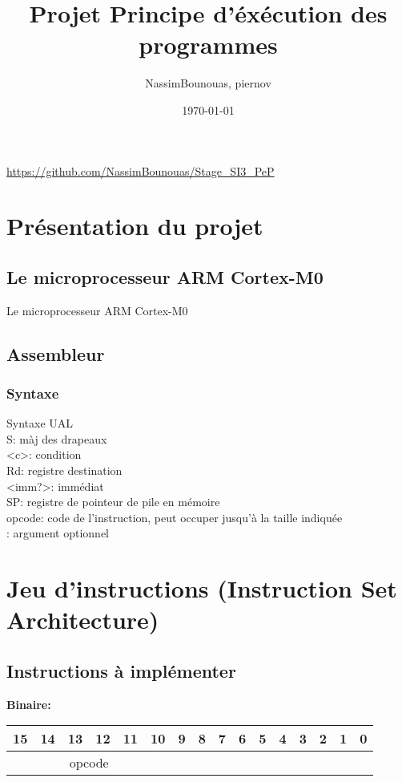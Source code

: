 \documentclass{article}
\title{Projet Principe d'éxécution des programmes}
\author{NassimBounouas, piernov}
\date{\today}
\begin{document}
\lstset{xleftmargin=.25in}

\maketitle
\textcolor{blue}{\url{https://github.com/NassimBounouas/Stage_SI3_PeP}}
\tableofcontents

\newpage

\section{Présentation du projet}
\subsection{Le microprocesseur ARM Cortex-M0}
	Le microprocesseur ARM Cortex-M0 

\subsection{Assembleur}

\subsubsection{Syntaxe}
Syntaxe UAL\\
S: màj des drapeaux\\
<c>: condition\\
Rd: registre destination\\
<imm?>: immédiat\\
SP: registre de pointeur de pile en mémoire\\
opcode: code de l'instruction, peut occuper jusqu'à la taille indiquée\\
\[\]: argument optionnel\\

\section{Jeu d'instructions (Instruction Set Architecture)}

\subsection{Instructions à implémenter}

\textbf{Binaire:}\\

\begin{tabular}{| c c c c c c c c c c c c c c c c |}
\hline
15 & 14 & 13 & 12 & 11 & 10 & \multicolumn{1}{|c}{9} & 8 & 7 & 6 & 5 & 4 & 3 & 2 & 1 & 0 \\
\hline
\multicolumn{6}{|c}{opcode} & \multicolumn{10}{|c|}{} \\
\hline
\end{tabular}
\end{document}

